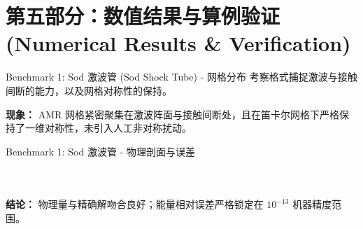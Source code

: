 \documentclass{beamer}
\begin{document}
	\section{第五部分：数值结果与算例验证 (Numerical Results \& Verification)}
	
	\begin{frame}{Benchmark 1: Sod 激波管 (Sod Shock Tube) - 网格分布}
		考察格式捕捉激波与接触间断的能力，以及网格对称性的保持。
		
		\begin{figure}[htpb]
			\centering
		\end{figure}
		
		\textbf{现象：} AMR 网格紧密聚集在激波阵面与接触间断处，且在笛卡尔网格下严格保持了一维对称性，未引入人工非对称扰动。
	\end{frame}
	
	\begin{frame}{Benchmark 1: Sod 激波管 - 物理剖面与误差}
		\begin{columns}
			\begin{figure}[htpb]
				\centering
				\fbox{\begin{minipage}[c][4.5cm][c]{\linewidth}
						\centering
						\textcolor{gray}{[图片占位] 图 4: 密度/压力/内能沿中心线剖面对比}
				\end{minipage}}
			\end{figure}
			
			\begin{figure}[htpb]
				\centering
				\fbox{\begin{minipage}[c][4.5cm][c]{\linewidth}
						\centering
						\textcolor{gray}{[图片占位] 图 3(b): 总能量相对误差历史}
				\end{minipage}}
			\end{figure}
		\end{columns}
		\vspace{0.2cm}
		\textbf{结论：} 物理量与精确解吻合良好；能量相对误差严格锁定在 $10^{-13}$ 机器精度范围。
	\end{frame}
	
\end{document}
